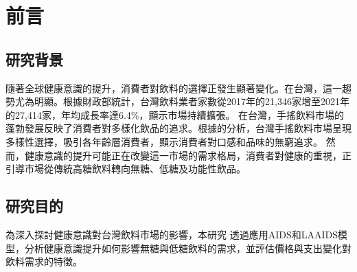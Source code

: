 \section{前言}

\subsection{研究背景}

隨著全球健康意識的提升，消費者對飲料的選擇正發生顯著變化。在台灣，這一趨勢尤為明顯。根據財政部統計，台灣飲料業者家數從2017年的21,346家增至2021年的27,414家，年均成長率達6.4\%，顯示市場持續擴張。
在台灣，手搖飲料市場的蓬勃發展反映了消費者對多樣化飲品的追求。根據\citet{lndata2022taiwandrink}的分析，台灣手搖飲料市場呈現多樣性選擇，吸引各年齡層消費者，顯示消費者對口感和品味的無窮追求。
然而，健康意識的提升可能正在改變這一市場的需求格局，消費者對健康的重視，正引導市場從傳統高糖飲料轉向無糖、低糖及功能性飲品\citep{RN3}。



\subsection{研究目的}

為深入探討健康意識對台灣飲料市場的影響，本研究
透過應用AIDS和LAAIDS模型，分析健康意識提升如何影響無糖與低糖飲料的需求，並評估價格與支出變化對飲料需求的特徵。